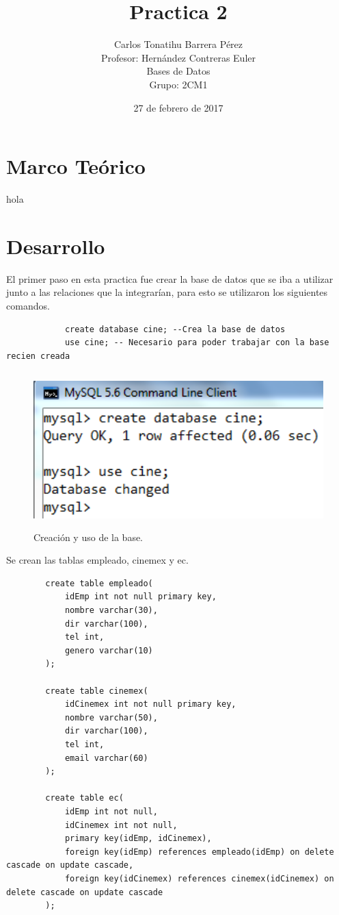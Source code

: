 \documentclass[12pt, titlepage]{article}
\title{Practica 2}
\author{Carlos Tonatihu Barrera Pérez \\ Profesor: Hernández Contreras Euler \\ Bases de Datos \\ Grupo: 2CM1 }
\date{27 de febrero de 2017}
\begin{document}
    \maketitle
    \tableofcontents
    \section{Marco Teórico}
    hola
    \section{Desarrollo}
        El primer paso en esta practica fue crear la base de datos que se iba a utilizar junto a las relaciones que la integrarían, para esto se utilizaron los siguientes comandos.
        \begin{lstlisting}
            create database cine; --Crea la base de datos
            use cine; -- Necesario para poder trabajar con la base recien creada
        \end{lstlisting}
        \begin{figure}[H]
            \begin{center}
                \includegraphics[width=12cm, height=6cm]{img/hasta-use.png}
                \caption{Creación y uso de la base.}
                \label{fig:hasta-use}
            \end{center}
        \end{figure}
    Se crean las tablas empleado, cinemex y ec.
        \begin{lstlisting}
        create table empleado(
            idEmp int not null primary key,
            nombre varchar(30),
            dir varchar(100),
            tel int,
            genero varchar(10)
        );
        
        create table cinemex(
            idCinemex int not null primary key,
            nombre varchar(50),
            dir varchar(100),
            tel int,
            email varchar(60)
        );
        
        create table ec(
            idEmp int not null,
            idCinemex int not null,
            primary key(idEmp, idCinemex),
            foreign key(idEmp) references empleado(idEmp) on delete cascade on update cascade,
            foreign key(idCinemex) references cinemex(idCinemex) on delete cascade on update cascade
        );
        \end{lstlisting}
\end{document}

